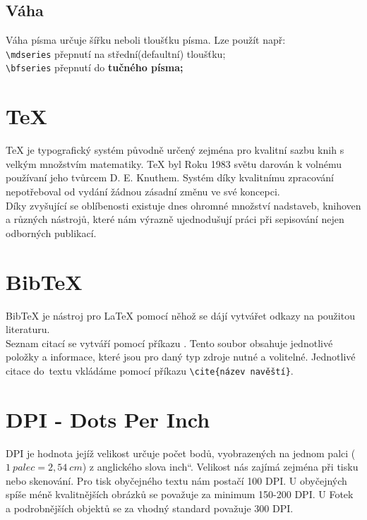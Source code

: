 \documentclass[a4paper, 11pt]{article}
\providecommand{\uv}[1]{\quotedblbase #1\textquotedblleft}
\begin{document}
\subsection{Váha}
Váha písma určuje šířku neboli tloušťku písma. Lze použít např: \\
\verb|\mdseries| \hspace{0.5cm} přepnutí na střední(defaultní) tloušťku; \\
\verb|\bfseries| \hspace{0.5cm} přepnutí do \bfseries tučného \normalfont písma;
\cite{latex_kompletni_pruvodce, typograficky_manual}

\section{\TeX}
\TeX \- je typografický systém původně určený zejména pro kvalitní sazbu knih s velkým množstvím matematiky. \TeX \- byl Roku 1983 světu darován k volnému používaní jeho tvůrcem D. E. Knuthem. Systém díky kvalitnímu zpracování 
nepotřeboval od vydání žádnou zásadní změnu ve své koncepci. \\Díky zvyšující se oblíbenosti existuje dnes ohromné množství nadstaveb, knihoven a různých nástrojů, které nám výrazně ujednodušují práci při sepisování nejen odborných publikací.
\cite{dipl_martin_cerny}

\section{Bib\TeX}
Bib\TeX \- je nástroj pro \LaTeX \- pomocí něhož se dájí vytvářet odkazy na použitou literaturu.    \\
Seznam citací se vytváří pomocí příkazu \verb||. Tento soubor obsahuje jednotlivé položky a informace, které jsou pro daný typ zdroje nutné a volitelné. 
Jednotlivé citace do~textu vkládáme pomocí příkazu \verb|\cite{název navěští}|.
\cite{dipl_michal_janda, bibtex_alex}

\section{DPI - Dots Per Inch}
DPI je hodnota jejíž velikost určuje počet bodů, vyobrazených na jednom palci ($1~palec = 2,54~cm$) z anglického slova \uv{inch}. Velikost nás zajímá zejména při tisku nebo skenování.
Pro tisk obyčejného textu nám postačí 100 DPI. U obyčejných spíše méně kvalitnějších obrázků se považuje za minimum 150-200 DPI. U Fotek a podrobnějších objektů se za vhodný standard považuje 300 DPI.
\cite{computer_casopis, vsellis, repronis_foto}

\pagebreak
\newpage


\def\refname{Literatura}

\end{document}
